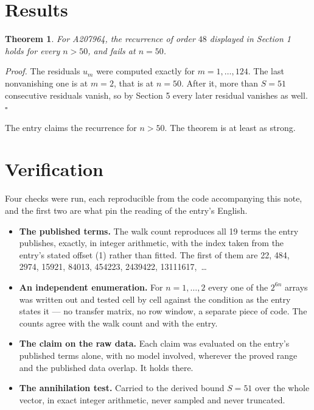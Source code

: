 \documentclass[11pt]{article}
\newtheorem{theorem}{Theorem}
\theoremstyle{definition}
\begin{document}
\section{Results}

\begin{theorem} For A207964, the recurrence of order $48$ displayed in Section 1 holds for every $n > 50$, and fails at $n = 50$.\end{theorem}

{\itshape Proof.} The residuals $u_m$ were computed exactly for $m = 1,\dots,124$. The last nonvanishing one is at $m = 2$, that is at $n = 50$. After it, more than $S = 51$ consecutive residuals vanish, so by Section 5 every later residual vanishes as well. $\square$

The entry claims the recurrence for $n > 50$. The theorem is at least as strong.

\section{Verification}

Four checks were run, each reproducible from the code accompanying this note, and the first two are what pin the reading of the entry's English.

\begin{itemize}

\item {\bfseries The published terms.} The walk count reproduces all 19 terms the entry publishes, exactly, in integer arithmetic, with the index taken from the entry's stated offset (1) rather than fitted. The first of them are 22, 484, 2974, 15921, 84013, 454223, 2439422, 13111617,~\dots

\item {\bfseries An independent enumeration.} For $n = 1,\dots,2$ every one of the $2^{6n}$ arrays was written out and tested cell by cell against the condition as the entry states it --- no transfer matrix, no row window, a separate piece of code. The counts agree with the walk count and with the entry.

\item {\bfseries The claim on the raw data.} Each claim was evaluated on the entry's published terms alone, with no model involved, wherever the proved range and the published data overlap. It holds there.

\item {\bfseries The annihilation test.} Carried to the derived bound $S = 51$ over the whole vector, in exact integer arithmetic, never sampled and never truncated.

\end{itemize}
\end{document}
